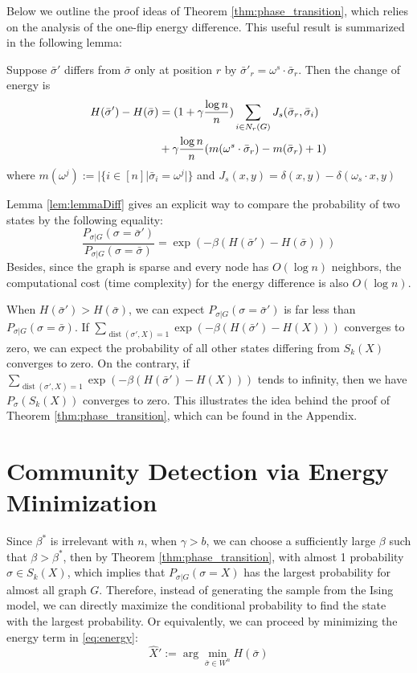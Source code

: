 \documentclass[entropy,article,submit,moreauthors,pdftex]{Definitions/mdpi}
\newcommand{\1}{\mathbbm{1}}
\DeclareMathOperator{\Dist}{dist}
\begin{document}
Below we outline the proof ideas of Theorem \ref{thm:phase_transition}, which relies on the analysis of the one-flip energy difference.
This useful result is summarized in the following lemma:
\begin{Lemma}\label{lem:lemmaDiff}
	Suppose $\bar{\sigma}'$ differs from $\bar{\sigma}$ only at position $r$ by $\bar{\sigma}'_r = \omega^s \cdot \bar{\sigma}_r$.
	Then the change of energy is
	\begin{align}
	H(\bar{\sigma}') - H(\bar{\sigma}) &= (1+\gamma \frac{\log n}{n})\sum_{i \in N_r(G)} J_s(\bar{\sigma}_r, \bar{\sigma}_i)
	\notag \\
	&+ \gamma \frac{\log n}{n} (m(\omega^s \cdot \bar{\sigma}_r)-m(\bar{\sigma}_r)+1) \label{eq:DeltaH}
	\end{align}
	where $m(\omega^j) := |\{i \in [n] | \bar{\sigma}_i = \omega^j | \}$ and $J_s(x, y) = \delta(x, y) - \delta(\omega_s \cdot x, y)$
\end{Lemma}
Lemma \ref{lem:lemmaDiff} gives an explicit way to compare the probability of two states by the following
equality:
\begin{equation}\label{eq:Pratio}
\frac{P_{\sigma |G } (\sigma = \bar{\sigma}')}{P_{\sigma |G } (\sigma = \bar{\sigma})}
= \exp(-\beta(H(\bar{\sigma}') - H(\bar{\sigma})))
\end{equation}
Besides, since the graph is sparse and every node has $O(\log n)$ neighbors, the computational cost (time complexity) for the energy difference
is also $O(\log n)$. 

When $H(\bar{\sigma}') > H(\bar{\sigma})$, we can expect $P_{\sigma | G}(\sigma = \bar{\sigma}')$ is far less than 
$P_{\sigma | G}(\sigma = \bar{\sigma})$.
If  $ \sum_{\Dist(\sigma', X)=1}\exp(-\beta(H(\bar{\sigma}') - H(X))) $ converges to zero,
we can expect the probability of all other states differing from $S_k(X)$ converges to zero.
On the contrary, if $ \sum_{\Dist(\sigma', X)=1}\exp(-\beta(H(\bar{\sigma}') - H(X))) $ tends to infinity,
then we have $P_{\sigma}(S_k(X))$ converges to zero. This illustrates the idea behind
the proof of
Theorem \ref{thm:phase_transition}, which can be found in the Appendix.


\section{Community Detection via Energy Minimization}\label{sec:em}
Since $\beta^*$ is irrelevant with $n$, when $\gamma>b$, we can choose a sufficiently large $\beta$ such that
$\beta > \beta^*$, then by Theorem \ref{thm:phase_transition}, with almost 1 probability $\sigma \in S_k(X)$, which
implies that $P_{\sigma | G}(\sigma = X)$ has the largest probability for almost all graph $G$. Therefore, instead of generating
the sample from the Ising model, we can directly maximize the conditional probability to find the state with the largest probability.
Or equivalently, we can proceed by minimizing the energy term in \eqref{eq:energy}:
\begin{equation}\label{eq:hatX}
\hat{X}' := \arg\min_{\bar{\sigma} \in W^n} H(\bar{\sigma})
\end{equation}
\end{document}
